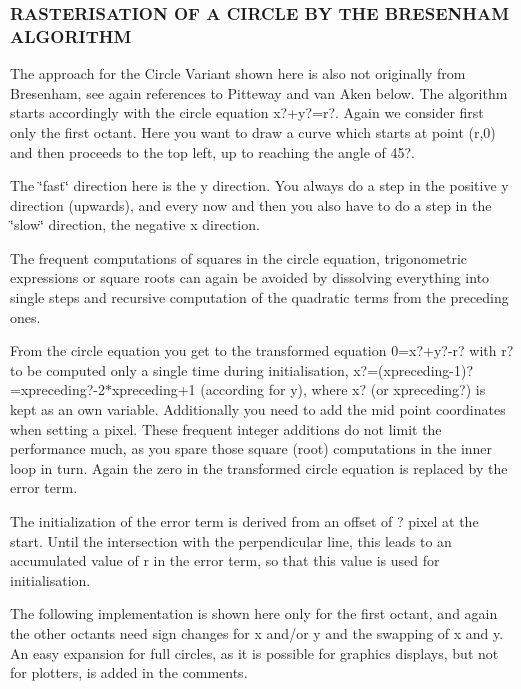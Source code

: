 \subsubsection*{R\+A\+S\+T\+E\+R\+I\+S\+A\+T\+I\+ON OF A C\+I\+R\+C\+LE BY T\+HE B\+R\+E\+S\+E\+N\+H\+AM A\+L\+G\+O\+R\+I\+T\+HM}

The approach for the Circle Variant shown here is also not originally from Bresenham, see again references to Pitteway and van Aken below. The algorithm starts accordingly with the circle equation x?+y?=r?. Again we consider first only the first octant. Here you want to draw a curve which starts at point (r,0) and then proceeds to the top left, up to reaching the angle of 45?.

The \char`\"{}fast\char`\"{} direction here is the y direction. You always do a step in the positive y direction (upwards), and every now and then you also have to do a step in the \char`\"{}slow\char`\"{} direction, the negative x direction.

The frequent computations of squares in the circle equation, trigonometric expressions or square roots can again be avoided by dissolving everything into single steps and recursive computation of the quadratic terms from the preceding ones.

From the circle equation you get to the transformed equation 0=x?+y?-\/r? with r? to be computed only a single time during initialisation, x?=(xpreceding-\/1)?=xpreceding?-\/2$\ast$xpreceding+1 (according for y), where x? (or xpreceding?) is kept as an own variable. Additionally you need to add the mid point coordinates when setting a pixel. These frequent integer additions do not limit the performance much, as you spare those square (root) computations in the inner loop in turn. Again the zero in the transformed circle equation is replaced by the error term.

The initialization of the error term is derived from an offset of ? pixel at the start. Until the intersection with the perpendicular line, this leads to an accumulated value of r in the error term, so that this value is used for initialisation.

The following implementation is shown here only for the first octant, and again the other octants need sign changes for x and/or y and the swapping of x and y. An easy expansion for full circles, as it is possible for graphics displays, but not for plotters, is added in the comments.

